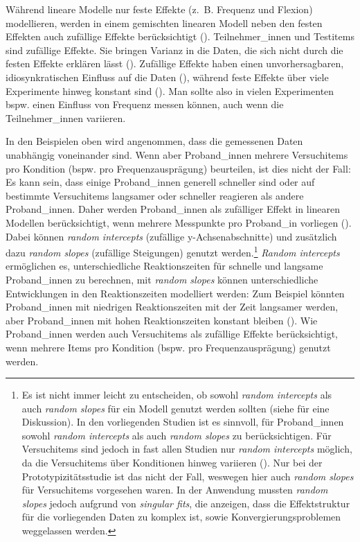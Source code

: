 Während lineare Modelle nur feste Effekte (z.~B. Frequenz und Flexion) modellieren, werden in einem gemischten linearen Modell neben den festen Effekten auch zufällige Effekte berücksichtigt (\cite[236]{Winter.2020}). Teilnehmer\_innen und Testitems sind zufällige Effekte. Sie bringen Varianz in die Daten, die sich nicht durch die festen Effekte erklären lässt (\cite[236]{Winter.2020}). Zufällige Effekte haben einen unvorhersagbaren, idiosynkratischen Einfluss auf die Daten (\cite[39]{Winter.2013}), während feste Effekte über viele Experimente hinweg konstant sind (\cite[236]{Winter.2020}). Man sollte also in vielen Experimenten bspw.  einen Einfluss von Frequenz messen können, auch wenn die Teilnehmer\_innen variieren.

In den Beispielen oben wird angenommen, dass die gemessenen Daten unabhängig voneinander sind. Wenn aber Proband\_innen mehrere Versuchitems pro Kondition (bspw. pro Frequenzausprägung) beurteilen, ist dies nicht der Fall: Es kann sein, dass einige Proband\_innen generell schneller sind oder auf bestimmte Versuchitems langsamer oder schneller reagieren als andere Proband\_innen. Daher werden Proband\_innen als zufälliger Effekt in linearen Modellen berücksichtigt, wenn mehrere Messpunkte pro Proband\_in vorliegen (\cite[236]{Winter.2020}). Dabei können \textit{random intercepts} (zufällige y-Achsenabschnitte) und zusätzlich dazu \textit{random slopes} (zufällige Steigungen) genutzt werden.\footnote{Es ist nicht immer leicht zu entscheiden, ob sowohl \textit{random intercepts} als auch \textit{random slopes} für ein Modell genutzt werden sollten (siehe \cite[241--244]{Winter.2020} für eine Diskussion). In den vorliegenden Studien ist es sinnvoll, für Proband\_innen sowohl \textit{random intercepts} als auch \textit{random slopes} zu berücksichtigen. Für Versuchitems sind jedoch in fast allen Studien nur \textit{random intercepts} möglich, da die Versuchitems über Konditionen hinweg variieren (\cite[243]{Winter.2020}). Nur bei der Prototypizitätsstudie ist das nicht der Fall, weswegen hier auch \textit{random slopes} für Versuchitems vorgesehen waren. In der Anwendung mussten \textit{random slopes} jedoch aufgrund von \textit{singular fits}, die anzeigen, dass die Effektstruktur für die vorliegenden Daten zu komplex ist, sowie Konvergierungsproblemen weggelassen werden.} \textit{Random intercepts} ermöglichen es, unterschiedliche Reaktionszeiten für schnelle und langsame Proband\_innen zu berechnen, mit \textit{random slopes} können unterschiedliche Entwicklungen in den Reak\-tionszeiten modelliert werden: Zum Beispiel könnten Proband\_innen mit niedrigen Reak\-tions\-zeiten mit der Zeit langsamer werden, aber Proband\_innen mit hohen Reaktionszeiten konstant bleiben (\cite[237--240; 267--268]{Winter.2020}). Wie Proband\_innen werden auch Versuchitems als zufällige Effekte berücksichtigt, wenn mehrere Items pro Kondition (bspw. pro Frequenzausprägung) genutzt werden. 

